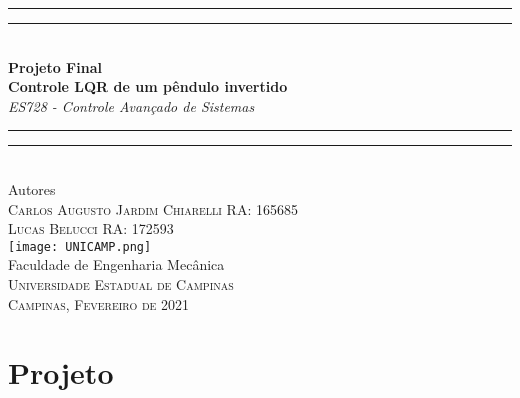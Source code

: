 \documentclass[a4paper]{article}
\begin{document}
\begin{titlepage}
\begin{center}
\vspace{25mm}
\rule[0.5ex]{\linewidth}{2pt}\vspace*{-\baselineskip}\vspace*{3.2pt}
\rule[0.5ex]{\linewidth}{1pt}\\[\baselineskip]
{\huge\textbf{Projeto Final\\Controle LQR de um pêndulo invertido}}\\[4mm]
{\Large \textit{ES728 - Controle Avançado de Sistemas}}\\
\rule[0.5ex]{\linewidth}{1pt}\vspace*{-\baselineskip}\vspace{4pt}
\rule[0.5ex]{\linewidth}{2pt}\\
\vspace{05mm}
{\large Autores}\\
\vspace{5mm}
{\large
\textsc{Carlos Augusto Jardim Chiarelli  \hfill RA: 165685\\}
\textsc{Lucas Belucci  \hfill RA: 172593\\}
}
\vspace{30mm}
\texttt{[image: UNICAMP.png]}\\
\vspace{6mm}
{\large Faculdade de Engenharia Mecânica\\
\textsc{Universidade Estadual de Campinas}}\\
\vspace{25mm}
{\large\textsc{Campinas, Fevereiro de 2021}}
\vspace{12mm}
\end{center}

\end{titlepage}

\hypersetup{linkbordercolor=black}

\begin{center}
\tableofcontents
\end{center}
\newpage

\section{Projeto}
\begin{figure}[h]
\qquad 
\qquad
{}
\end{figure}
\end{document}
